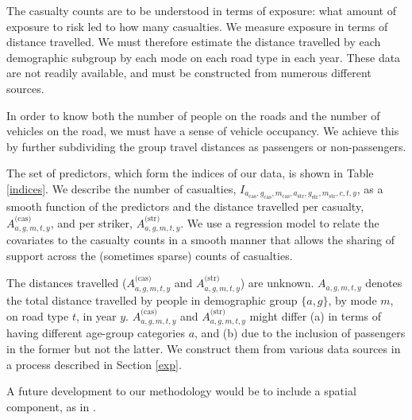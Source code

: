 \documentclass{article}
\begin{document}

The casualty counts are to be understood in terms of exposure: what amount of exposure to risk led to how many casualties. We measure exposure in terms of distance travelled. We must therefore estimate the distance travelled by each demographic subgroup by each mode on each road type in each year. These data are not readily available, and must be constructed from numerous different sources.

In order to know both the number of people on the roads and the number of vehicles on the road, we must have a sense of vehicle occupancy. We achieve this by further subdividing the group travel distances as passengers or non-passengers.

The set of predictors, which form the indices of our data, is shown in Table \ref{indices}. We describe the number of casualties, $I_{a_{\text{cas}},g_{\text{cas}},m_{\text{cas}},a_{\text{str}},g_{\text{str}},m_{\text{str}},c,t,y}$, as a smooth function of the predictors and the distance travelled per casualty, $A_{a,g,m,t,y}^{\text{(cas)}}$, and per striker, $A_{a,g,m,t,y}^{\text{(str)}}$. We use a regression model to relate the covariates to the casualty counts in a smooth manner that allows the sharing of support across the (sometimes sparse) counts of casualties. 

The distances travelled ($A_{a,g,m,t,y}^{\text{(cas)}}$ and $A_{a,g,m,t,y}^{\text{(str)}}$) are unknown. $A_{a,g,m,t,y}$ denotes the total distance travelled by people in demographic group $\{a,g\}$, by mode $m$, on road type $t$, in year $y$. $A_{a,g,m,t,y}^{\text{(cas)}}$ and $A_{a,g,m,t,y}^{\text{(str)}}$ might differ (a) in terms of having different age-group categories $a$, and (b) due to the inclusion of passengers in the former but not the latter. We construct them from various data sources in a process described in Section \ref{exp}.

A future development to our methodology would be to include a spatial component, as in \citet{Boulieri2016}. 
\end{document}
